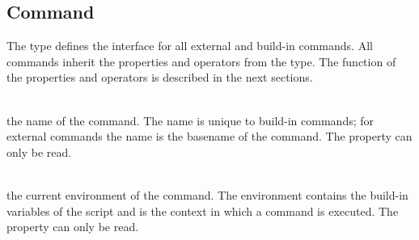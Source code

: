 \subsection{Command} 

%

The  type defines the interface for all external and
build-in commands. All commands inherit the properties and operators
from the  type.
The function of the properties and operators is described
in the next sections.

\begin{asparadesc}
%
\item[\code{theName}] \hfill \\
the name of the command. The name is unique to build-in commands; for external
commands the name is the basename\cite{basename13} of the command.
The property can only be read.
%
\item[\code{theEnvironment}] \hfill \\
the current environment of the command. The environment contains the
build-in variables of the script and is the context in which a command is executed.
The property can only be read.
%
\end{asparadesc}


